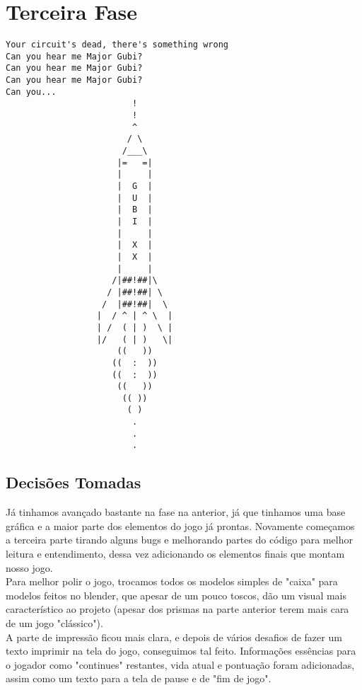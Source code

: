 \documentclass[12pt,a4paper]{article}
\begin{document}
		
	\newpage	
	\section{Terceira Fase}
	\begin{verbatim}
Your circuit's dead, there's something wrong
Can you hear me Major Gubi?
Can you hear me Major Gubi?
Can you hear me Major Gubi?
Can you...
                         !
                         !
                         ^
                        / \
                       /___\
                      |=   =|
                      |     |
                      |  G  |
                      |  U  |
                      |  B  |
                      |  I  |
                      |     |
                      |  X  |
                      |  X  |
                      |     |
                     /|##!##|\
                    / |##!##| \
                   /  |##!##|  \
                  |  / ^ | ^ \  |
                  | /  ( | )  \ |
                  |/   ( | )   \|
                      ((   ))
                     ((  :  ))
                     ((  :  ))
                      ((   ))
                       (( ))
                        ( )
                         .
                         .
                         .
	\end{verbatim}
  \subsection{Decisões Tomadas}
        Já tinhamos avançado bastante na fase na anterior, já que tinhamos uma base gráfica e a maior parte
    dos elementos do jogo já prontas. Novamente começamos a terceira parte tirando alguns bugs e melhorando 
    partes do código para melhor leitura e entendimento, dessa vez adicionando os elementos finais que montam
    nosso jogo. \\
    
        Para melhor polir o jogo, trocamos todos os modelos simples de "caixa" para modelos feitos no blender, que
    apesar de um pouco toscos, dão um visual mais característico ao projeto (apesar dos prismas na parte anterior
    terem mais cara de um jogo "clássico").\\
    
        A parte de impressão ficou mais clara, e depois de vários desafios de fazer um texto imprimir na tela do jogo, 
    conseguimos tal feito. Informações essências para o jogador como "continues" restantes, vida atual e pontuação 
    foram adicionadas, assim como um texto para a tela de pause e de "fim de jogo".\\
        
\end{document}
